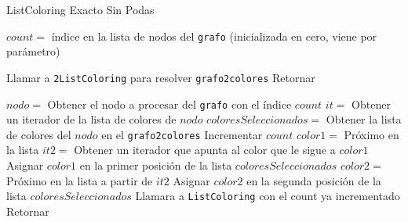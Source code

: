 \begin{algorithm}
\caption{ListColoring Exacto Sin Podas}
\label{lce}
\begin{algorithmic} 

\STATE $count = $ índice en la lista de nodos del \texttt{grafo} (inicializada en cero, viene por parámetro) 

	\STATE Llamar a \texttt{2ListColoring} para resolver \texttt{grafo2colores} 
	\STATE Retornar 
\ENDIF

\STATE $nodo = $ Obtener el nodo a procesar del \texttt{grafo} con el índice $count$ 
\STATE $it = $ Obtener un iterador de la lista de colores de $nodo$ 
\STATE $coloresSeleccionados = $ Obtener la lista de colores del $nodo$ en el \texttt{grafo2colores} 
\STATE Incrementar $count$ 
	\STATE $color1 = $ Próximo en la lista 
	\STATE $it2 = $ Obtener un iterador que apunta al color que le sigue a $color1$ 
	\STATE Asignar $color1$ en la primer posición de la lista $coloresSeleccionados$ 
		\STATE $color2 = $ Próximo en la lista a partir de $it2$ 
		\STATE Asignar $color2$ en la segunda posición de la lista $coloresSeleccionados$ 
		\STATE Llamara a \texttt{ListColoring} con el count ya incrementado %
	\ENDWHILE
\ENDWHILE
\STATE Retornar
\end{algorithmic}
\end{algorithm}


% 
% 

